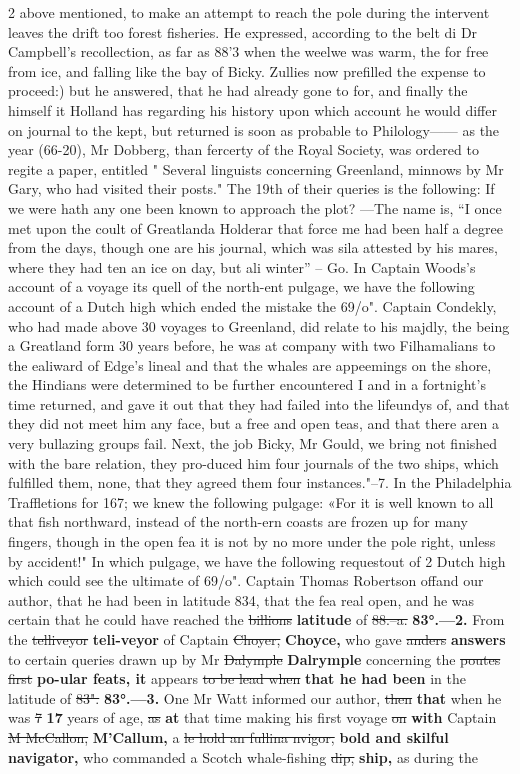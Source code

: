 \documentclass[10pt]{article}
\begin{document}
\begin{multicols}{2}
above mentioned, to make an attempt to reach the pole during the intervent leaves the drift too forest fisheries. He expressed, according to the belt di Dr Campbell's recollection, as far as 88'3 when the weelwe was warm, the for free from ice, and falling like the bay of Bicky. Zullies now prefilled the expense to proceed:) but he answered, that he had already gone to for, and finally the himself it Holland has regarding his history upon which account he would differ on journal to the kept, but returned is soon as probable to Philology—— as the year (66-20), Mr Dobberg, than fercerty of the Royal Society, was ordered to regite a paper, entitled " Several linguists concerning Greenland, minnows by Mr Gary, who had visited their posts." The 19th of their queries is the following: If we were hath any one been known to approach the plot? —The name is, “I once met upon the coult of Greatlanda Holderar that force me had been half a degree from the days, though one are his journal, which was sila attested by his mares, where they had ten an ice on day, but ali winter” – Go. In Captain Woods’s account of a voyage its quell of the north-ent pulgage, we have the following account of a Dutch high which ended the mistake the 69/o". Captain Condekly, who had made above 30 voyages to Greenland, did relate to his majdly, the being a Greatland form 30 years before, he was at company with two Filhamalians to the ealiward of Edge’s lineal and that the whales are appeemings on the shore, the Hindians were determined to be further encountered I and in a fortnight’s time returned, and gave it out that they had failed into the lifeundys of, and that they did not meet him any face, but a free and open teas, and that there aren a very bullazing groups fail. Next, the job Bicky, Mr Gould, we bring not finished with the bare relation, they pro-duced him four journals of the two ships, which fulfilled them, none, that they agreed them four instances."--7. In the Philadelphia Traffletions for 167; we knew the following pulgage: «For it is well known to all that fish northward, instead of the north-ern coasts are frozen up for many fingers, though in the open fea it is not by no more under the pole right, unless by accident!" In which pulgage, we have the following requestout of 2 Dutch high which could see the ultimate of 69/o". Captain Thomas Robertson offand our author, that he had been in latitude 834, that the fea real open, and he was certain that he could have reached the \sout{billions} \textbf{latitude} of \sout{88.--a.} \textbf{83°.—2.} From the \sout{telliveyor} \textbf{teli-veyor} of Captain \sout{Choyer,} \textbf{Choyce,} who gave \sout{anders} \textbf{answers} to certain queries drawn up by Mr \sout{Dalymple} \textbf{Dalrymple} concerning the \sout{poutes first} \textbf{po-ular feats, it} appears \sout{to be lead when} \textbf{that he had been} in the latitude of \sout{83".} \textbf{83°.—3.} One Mr Watt informed our author, \sout{then} \textbf{that} when he was \sout{7} \textbf{17} years of age, \sout{as} \textbf{at} that time making his first voyage \sout{on} \textbf{with} Captain \sout{M McCallon,} \textbf{M'Callum,} a \sout{le hold an fullina nvigor,} \textbf{bold and skilful navigator,} who commanded a Scotch whale-fishing \sout{dip,} \textbf{ship,} as during the 
\end{multicols}
\end{document}
